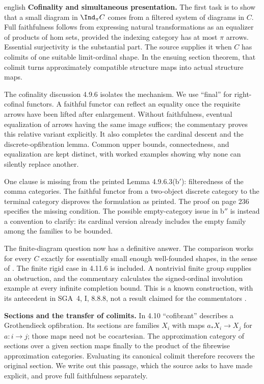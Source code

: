 \begin{otherlanguage*}{english}
\medskip\noindent\textbf{Cofinality and simultaneous presentation.}
The first task is to show that a small diagram in $\Ind_\pi C$ comes from a filtered system of diagrams in $C$. Full faithfulness follows from expressing natural transformations as an equalizer of products of hom sets, provided the indexing category has at most $\pi$ arrows. Essential surjectivity is the substantial part. The source supplies it when $C$ has colimits of one suitable limit-ordinal shape. In the ensuing section theorem, that colimit turns approximately compatible structure maps into actual structure maps.

The cofinality discussion 4.9.6 isolates the mechanism. We use ``final'' for right-cofinal functors. A faithful functor can reflect an equality once the requisite arrows have been lifted after enlargement. Without faithfulness, eventual equalization of arrows having the same image suffices; the commentary proves this relative variant explicitly. It also completes the cardinal descent and the discrete-opfibration lemma. Common upper bounds, connectedness, and equalization are kept distinct, with worked examples showing why none can silently replace another.

One clause is missing from the printed Lemma 4.9.6.3(b$'$): filteredness of the comma categories. The faithful functor from a two-object discrete category to the terminal category disproves the formulation as printed. The proof on page 236 specifies the missing condition. The possible empty-category issue in b$''$ is instead a convention to clarify: its cardinal version already includes the empty family among the families to be bounded.

The finite-diagram question now has a definitive answer. The comparison works for every $C$ exactly for essentially small enough well-founded shapes, in the sense of \citet[Theorem 1.3]{Henry2025Ind}. The finite rigid case in 4.11.6 is included. A nontrivial finite group supplies an obstruction, and the commentary calculates the signed-ordinal involution example at every infinite completion bound. This is a known construction, with its antecedent in SGA~4, I, 8.8.8, not a result claimed for the commentators \citep{SGA4I1972}.

\medskip\noindent\textbf{Sections and the transfer of colimits.}
In 4.10 ``cofibrant'' describes a Grothendieck opfibration. Its sections are families $X_i$ with maps $a_*X_i\to X_j$ for $a:i\to j$; those maps need not be cocartesian. The approximation category of sections over a given section maps finally to the product of the fibrewise approximation categories. Evaluating its canonical colimit therefore recovers the original section. We write out this passage, which the source asks to have made explicit, and prove full faithfulness separately.


\end{otherlanguage*}
